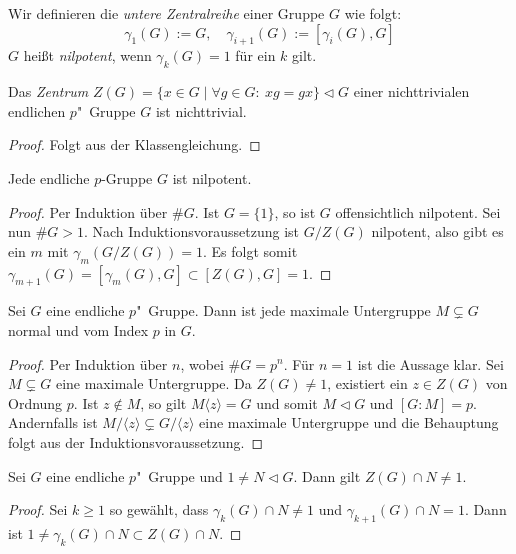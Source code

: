 \documentclass[11pt,a4paper,openany]{memoir}
\begin{document}
\begin{definition}
Wir definieren die \textit{untere Zentralreihe} einer Gruppe $G$ wie folgt:
\[\gamma_1(G):=G,\quad \gamma_{i+1}(G):=[\gamma_i(G),G] \]
$G$ heißt \textit{nilpotent}, wenn $\gamma_k(G)=1$ für ein $k$ gilt.
\end{definition}

\begin{proposition}
Das \textit{Zentrum} $Z(G)=\{x\in G\mid \forall g\in G:\ xg=gx \}\lhd G$ einer nichttrivialen endlichen $p$"~Gruppe $G$ ist nichttrivial.
\end{proposition}

\begin{proof}
Folgt aus der Klassengleichung.
\end{proof}

\begin{proposition}\label{0.4.ii}
Jede endliche $p$-Gruppe $G$ ist nilpotent.
\end{proposition}

\begin{proof}
Per Induktion über $\#G$. Ist $G=\{1\}$, so ist $G$ offensichtlich nilpotent. Sei nun $\#G>1$. Nach Induktionsvoraussetzung ist $G/Z(G)$ nilpotent, also gibt es ein $m$ mit $\gamma_m(G/Z(G))=1$. Es folgt somit $\gamma_{m+1}(G)=[\gamma_m(G),G]\subset [Z(G),G]=1$.
\end{proof}

\begin{proposition}\label{0.4.iii}
Sei $G$ eine endliche $p$"~Gruppe. Dann ist jede maximale Untergruppe $M\subsetneq G$ normal und vom Index $p$ in $G$.
\end{proposition}

\begin{proof}
Per Induktion über $n$, wobei $\#G=p^n$. Für $n=1$ ist die Aussage klar. Sei $M\subsetneq G$ eine maximale Untergruppe. Da $Z(G)\neq 1$, existiert ein $z\in Z(G)$ von Ordnung $p$. Ist $z\not\in M$, so gilt $M\langle z\rangle=G$ und somit $M\lhd G$ und $[G:M]=p$. Andernfalls ist $M/\langle z\rangle\subsetneq G/\langle z\rangle$ eine maximale Untergruppe und die Behauptung folgt aus der Induktionsvoraussetzung.
\end{proof}

\begin{lemma}\label{0.4.v:lemma}
Sei $G$ eine endliche $p$"~Gruppe und $1\neq N\lhd G$. Dann gilt $Z(G)\cap N\neq 1$.
\end{lemma}

\begin{proof}
Sei $k\geq 1$ so gewählt, dass $\gamma_k(G)\cap N\neq 1$ und $\gamma_{k+1}(G)\cap N=1$. Dann ist $1\neq\gamma_k(G)\cap N\subset Z(G)\cap N$.
\end{proof}
\end{document}
